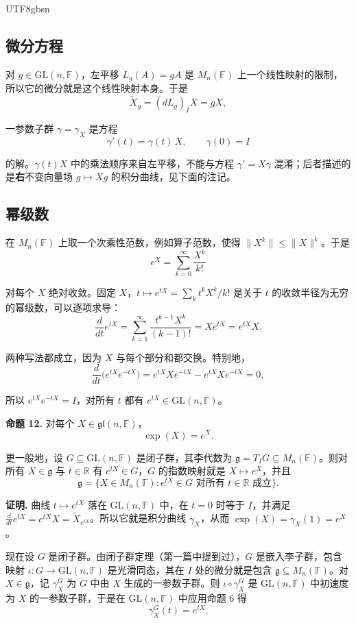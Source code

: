 \documentclass[11pt]{article}
\begin{document}
\begin{CJK*}{UTF8}{gbsn}
\subsection{微分方程}

对 $g \in \mathrm{GL}(n, \mathbb{F})$，左平移 $L_g(A) = gA$ 是 $M_n(\mathbb{F})$ 上一个线性映射的限制，所以它的微分就是这个线性映射本身。于是
\[
\widetilde{X}_g = (dL_g)_I X = gX,
\]

一参数子群 $\gamma = \gamma_X$ 是方程
\[
\gamma'(t) = \gamma(t)\, X, \qquad \gamma(0) = I
\]

的解。$\gamma(t)X$ 中的乘法顺序来自左平移，不能与方程 $\gamma' = X\gamma$ 混淆；后者描述的是\textbf{右}不变向量场 $g \mapsto Xg$ 的积分曲线，见下面的注记。

\subsection{幂级数}

在 $M_n(\mathbb{F})$ 上取一个次乘性范数，例如算子范数，使得 $\|X^k\| \le \|X\|^k$。于是
\[
e^X = \sum_{k=0}^{\infty} \frac{X^k}{k!}
\]

对每个 $X$ 绝对收敛。固定 $X$，$t \mapsto e^{tX} = \sum_k t^k X^k / k!$ 是关于 $t$ 的收敛半径为无穷的幂级数，可以逐项求导：
\[
\frac{d}{dt} e^{tX} = \sum_{k=1}^{\infty} \frac{t^{k-1} X^k}{(k-1)!} = X e^{tX} = e^{tX} X.
\]

两种写法都成立，因为 $X$ 与每个部分和都交换。特别地，
\[
\frac{d}{dt}\bigl(e^{tX} e^{-tX}\bigr) = e^{tX} X e^{-tX} - e^{tX} X e^{-tX} = 0,
\]

所以 $e^{tX} e^{-tX} = I$，对所有 $t$ 都有 $e^{tX} \in \mathrm{GL}(n, \mathbb{F})$。

\textbf{命题 12.} 对每个 $X \in \mathfrak{gl}(n, \mathbb{F})$，
\[
\boxed{\exp(X) = e^X.}
\]

更一般地，设 $G \subseteq \mathrm{GL}(n, \mathbb{F})$ 是闭子群，其李代数为 $\mathfrak{g} = T_IG \subseteq M_n(\mathbb{F})$。则对所有 $X \in \mathfrak{g}$ 与 $t \in \mathbb{R}$ 有 $e^{tX} \in G$，$G$ 的指数映射就是 $X \mapsto e^X$，并且
\[
\mathfrak{g} = \{ X \in M_n(\mathbb{F}) : e^{tX} \in G \text{ 对所有 } t \in \mathbb{R} \text{ 成立} \}.
\]

\textbf{证明.} 曲线 $t \mapsto e^{tX}$ 落在 $\mathrm{GL}(n, \mathbb{F})$ 中，在 $t = 0$ 时等于 $I$，并满足 $\frac{d}{dt} e^{tX} = e^{tX} X = \widetilde{X}_{e^{tX}}$。所以它就是积分曲线 $\gamma_X$，从而 $\exp(X) = \gamma_X(1) = e^X$。

现在设 $G$ 是闭子群。由闭子群定理（第一篇中提到过），$G$ 是嵌入李子群，包含映射 $\iota : G \to \mathrm{GL}(n, \mathbb{F})$ 是光滑同态，其在 $I$ 处的微分就是包含 $\mathfrak{g} \subseteq M_n(\mathbb{F})$。对 $X \in \mathfrak{g}$，记 $\gamma^G_X$ 为 $G$ 中由 $X$ 生成的一参数子群。则 $\iota \circ \gamma^G_X$ 是 $\mathrm{GL}(n, \mathbb{F})$ 中初速度为 $X$ 的一参数子群，于是在 $\mathrm{GL}(n, \mathbb{F})$ 中应用命题 6 得
\[
\gamma^G_X(t) = e^{tX}.
\]


\end{CJK*}
\end{document}
